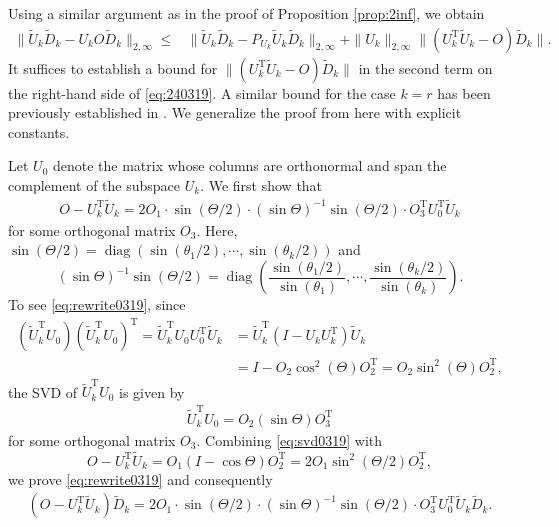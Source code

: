 \documentclass[reqno]{amsart}
\DeclareMathOperator{\diag}{diag}
\newcommand{\T}{\mathrm{T}}
\theoremstyle{plain}
\theoremstyle{definition}
\begin{document}
Using a similar argument as in the proof of Proposition \ref{prop:2inf}, we obtain
\begin{align}\label{eq:240319}
\| \widetilde{U}_{k}\widetilde{D}_{k} - {U}_kO\widetilde{D}_{k}\|_{2,\infty}\le &\| \widetilde{U}_{k}\widetilde{D}_{k} - P_{U_k} \widetilde{U}_{k} \widetilde{D}_{k}\|_{2,\infty} + \|{U}_k\|_{2,\infty} \|({U}_k^\T \widetilde{U}_{k} - O)\widetilde{D}_{k}\|.
\end{align}
It suffices to establish a bound for $\|({U}_k^\T \widetilde{U}_{k} - O)\widetilde{D}_{k}\|$ in the second term on the right-hand side of \eqref{eq:240319}. A similar bound for the case $k=r$ has  been  previously established in \cite[Lemma 15]{YW24}. We generalize the proof from \cite[Lemma 15]{YW24} here with explicit constants.

Let $U_0$ denote  the matrix whose columns are orthonormal and span the complement of the subspace $U_k$. We first show that 
\begin{align}\label{eq:rewrite0319}
O - {U}_k^\T \widetilde{U}_{k} = 2 O_1 \cdot\sin(\Theta/2)\cdot (\sin\Theta)^{-1}\sin(\Theta/2) \cdot O_3^\T U_0^\T \widetilde{U}_{k}
\end{align}
for some orthogonal matrix $O_3$. Here, $\sin(\Theta/2) =\diag(\sin(\theta_1/2),\cdots, \sin(\theta_k/2))$ and $$(\sin\Theta)^{-1}\sin(\Theta/2) = \diag\left( \frac{\sin(\theta_1/2)}{\sin(\theta_1)}, \cdots, \frac{\sin(\theta_k/2)}{\sin(\theta_k)}\right).$$
To see \eqref{eq:rewrite0319}, since
\begin{align*}
(\widetilde{U}_{k}^\T U_0)(\widetilde{U}_{k}^\T U_0)^\T = \widetilde{U}_{k}^\T U_0 U_0^\T \widetilde{U}_{k} &=  \widetilde{U}_{k}^\T (I-U_k U_k^\T) \widetilde{U}_{k}\\
& = I - O_2 \cos^2(\Theta) O_2^\T=O_2\sin^2(\Theta)O_2^\T,
\end{align*}
the SVD of $\widetilde{U}_{k}^\T U_0$ is given by 
\begin{align}\label{eq:svd0319}
\widetilde{U}_{k}^\T U_0 = O_2 (\sin \Theta) O_3^\T
\end{align}
for some orthogonal matrix $O_3$. Combining \eqref{eq:svd0319} with 
$$O-{U}_k^\T \widetilde{U}_{k} = O_1(I - \cos\Theta) O_2^\T =2 O_1 \sin^2(\Theta/2) O_2^\T,$$
we prove \eqref{eq:rewrite0319} and consequently
\begin{align}\label{eq:rewrite031901}
(O - {U}_k^\T \widetilde{U}_{k}) \widetilde{D}_{k} = 2 O_1 \cdot\sin(\Theta/2)\cdot (\sin\Theta)^{-1}\sin(\Theta/2) \cdot O_3^\T U_0^\T \widetilde{U}_{k}\widetilde{D}_{k}.
\end{align}
\end{document}
